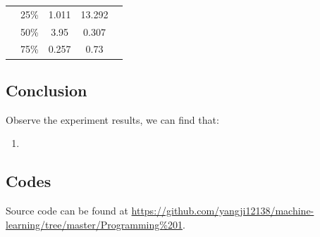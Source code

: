 \documentclass{article}
\begin{document}
\begin{table}[H]
\begin{tabular}{|c|c|c|c|c}
        & 25\%                                                    & 1.011                  & 13.292                                                                       &                                                                                                       \\ \cline{1-4}
        & 50\%                                                    & 3.95                   & 0.307                                                                        &                                                                                                       \\ \cline{1-4}
        & 75\%                                                    & 0.257                  & 0.73                                                                         &                                                                                                       \\ \cline{1-4}
    \end{tabular}
    \end{table}

\subsection*{Conclusion}
Observe the experiment results, we can find that:

\begin{enumerate}[label=(\roman*)]
    \item 
\end{enumerate}

\subsection*{Codes}

Source code can be found at \url{https://github.com/yangji12138/machine-learning/tree/master/Programming%201}.

%
\end{document}
